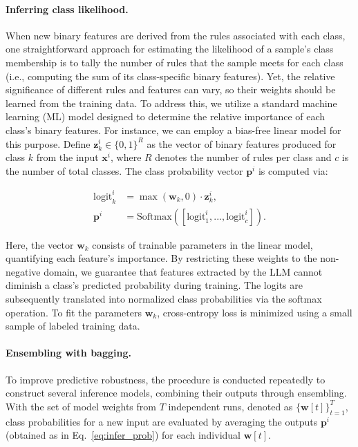 \vspace*{-0.12in}
\paragraph{Inferring class likelihood.} When new binary features are derived from the rules associated with each class, one straightforward approach for estimating the likelihood of a sample's class membership is to tally the number of rules that the sample meets for each class (i.e., computing the sum of its class-specific binary features). Yet, the relative significance of different rules and features can vary, so their weights should be learned from the training data. To address this, we utilize a standard machine learning (ML) model designed to determine the relative importance of each class's binary features. For instance, we can employ a bias-free linear model for this purpose. Define $\mathbf{z}_k^i \in \{0, 1\}^R$ as the vector of binary features produced for class $k$ from the input $\mathbf{x}^i$, where $R$ denotes the number of rules per class and $c$ is the number of total classes. The class probability vector $\mathbf{p}^i$ is computed via:

\begin{align}
\text{logit}_k^i &= \max(\mathbf{w}_k, 0) \cdot \mathbf{z}_k^i, \nonumber \\
\mathbf{p}^i &= \text{Softmax}({[\text{logit}_{1}^i, ..., \text{logit}_{c}^i]}). \label{eq:infer_prob}
\end{align}

Here, the vector $\mathbf{w}_k$ consists of trainable parameters in the linear model, quantifying each feature's importance. By restricting these weights to the non-negative domain, we guarantee that features extracted by the LLM cannot diminish a class's predicted probability during training. The logits are subsequently translated into normalized class probabilities via the softmax operation. To fit the parameters $\mathbf{w}_k$, cross-entropy loss is minimized using a small sample of labeled training data.

\vspace*{-0.12in}
\paragraph{Ensembling with bagging.} To improve predictive robustness, the procedure is conducted repeatedly to construct several inference models, combining their outputs through ensembling. With the set of model weights from $T$ independent runs, denoted as $\{\mathbf{w}[t]\}_{t=1}^T$, class probabilities for a new input are evaluated by averaging the outputs $\mathbf{p}^i$ (obtained as in Eq.~\ref{eq:infer_prob}) for each individual $\mathbf{w}[t]$.

